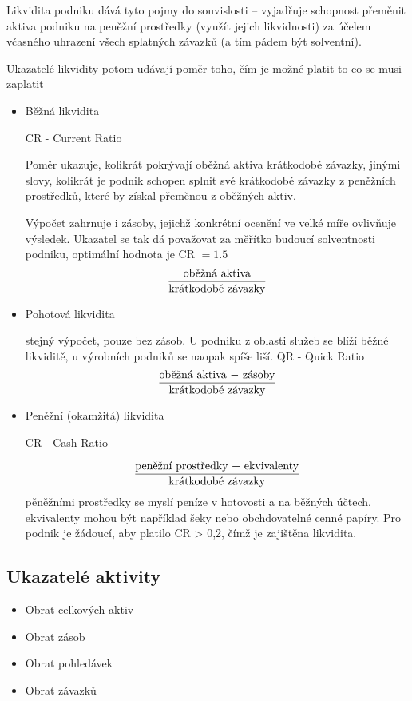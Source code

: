 Likvidita podniku dává tyto pojmy do souvislosti -- vyjadřuje schopnost přeměnit aktiva podniku na peněžní prostředky (využít jejich likvidnosti) za účelem včasného uhrazení všech splatných závazků (a tím pádem být solventní).

Ukazatelé likvidity potom udávají poměr toho, čím je možné platit to co se musi zaplatit

\begin{itemize}
\item{Běžná likvidita} 

CR - Current Ratio

Poměr ukazuje, kolikrát pokrývají oběžná aktiva krátkodobé závazky, jinými slovy, kolikrát je podnik schopen splnit své krátkodobé závazky z peněžních prostředků, které by získal přeměnou z oběžných aktiv.

Výpočet zahrnuje i zásoby, jejichž konkrétní ocenění ve velké míře ovlivňuje výsledek.
Ukazatel se tak dá považovat za měřítko budoucí solventnosti podniku, optimální hodnota je CR $= 1.5$
$$\dfrac{\text{oběžná aktiva}}{\text{krátkodobé závazky}}$$

\item{Pohotová likvidita} 

stejný výpočet, pouze bez zásob. U podniku z oblasti služeb se blíží běžné likviditě, u výrobních podniků se naopak spíše liší.
QR - Quick Ratio
$$\dfrac{\text{oběžná aktiva $-$ zásoby}}{\text{krátkodobé závazky}}$$

\item{Peněžní (okamžitá) likvidita}

CR - Cash Ratio

$$\dfrac{\text{peněžní prostředky $+$ ekvivalenty}}{\text{krátkodobé závazky}}$$
pěněžními prostředky se myslí peníze v hotovosti a na běžných účtech, ekvivalenty mohou být například šeky nebo obchdovatelné cenné papíry. Pro podnik je žádoucí, aby platilo CR > 0,2, čímž je zajištěna likvidita.
\end{itemize}


\subsection{Ukazatelé aktivity}
\begin{itemize}
\item{Obrat celkových aktiv}
\item{Obrat zásob}
\item{Obrat pohledávek}
\item{Obrat závazků}
\end{itemize}

